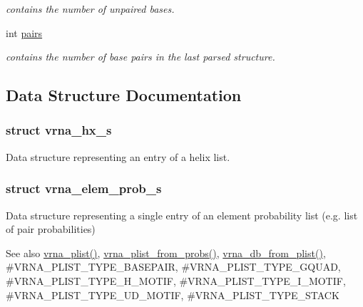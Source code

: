\begin{DoxyCompactItemize}
\begin{DoxyCompactList}\small\item\em contains the number of unpaired bases. \end{DoxyCompactList}\item 
\mbox{\label{group__struct__utils_ga6341cbb704924824e0236c1dce791032}} 
int \hyperlink{group__struct__utils_ga6341cbb704924824e0236c1dce791032}{pairs}
\begin{DoxyCompactList}\small\item\em contains the number of base pairs in the last parsed structure. \end{DoxyCompactList}\end{DoxyCompactItemize}


\subsection{Data Structure Documentation}
\label{structvrna__hx__s}
\subsubsection{struct vrna\+\_\+hx\+\_\+s}
Data structure representing an entry of a helix list. \label{structvrna__elem__prob__s}
\subsubsection{struct vrna\+\_\+elem\+\_\+prob\+\_\+s}
Data structure representing a single entry of an element probability list (e.\+g. list of pair probabilities) 

\begin{DoxySeeAlso}{See also}
\hyperlink{group__struct__utils_gaf002d69024d709744664a8b9ca3dd77d}{vrna\+\_\+plist()}, \hyperlink{group__pf__fold_ga94f6efc0b8d8712b023452794a0a5bd2}{vrna\+\_\+plist\+\_\+from\+\_\+probs()}, \hyperlink{group__struct__utils_ga6a51a36b9245d0bac868c5cd172b9611}{vrna\+\_\+db\+\_\+from\+\_\+plist()}, \#\+V\+R\+N\+A\+\_\+\+P\+L\+I\+S\+T\+\_\+\+T\+Y\+P\+E\+\_\+\+B\+A\+S\+E\+P\+A\+IR, \#\+V\+R\+N\+A\+\_\+\+P\+L\+I\+S\+T\+\_\+\+T\+Y\+P\+E\+\_\+\+G\+Q\+U\+AD, \#\+V\+R\+N\+A\+\_\+\+P\+L\+I\+S\+T\+\_\+\+T\+Y\+P\+E\+\_\+\+H\+\_\+\+M\+O\+T\+IF, \#\+V\+R\+N\+A\+\_\+\+P\+L\+I\+S\+T\+\_\+\+T\+Y\+P\+E\+\_\+\+I\+\_\+\+M\+O\+T\+IF, \#\+V\+R\+N\+A\+\_\+\+P\+L\+I\+S\+T\+\_\+\+T\+Y\+P\+E\+\_\+\+U\+D\+\_\+\+M\+O\+T\+IF, \#\+V\+R\+N\+A\+\_\+\+P\+L\+I\+S\+T\+\_\+\+T\+Y\+P\+E\+\_\+\+S\+T\+A\+CK 
\end{DoxySeeAlso}


